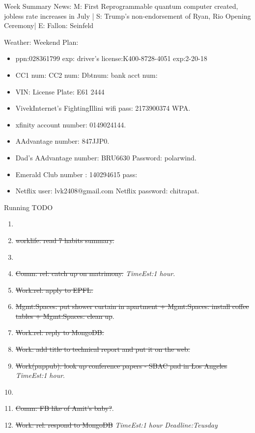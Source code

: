 \documentclass[serif, mathserif, final]{beamer}
\newcommand{\doneTask}[1]{\tiny \item \tiny \sout{#1}}
\newcommand{\te}[1]{\textit{TimeEst:}\textit{#1}}
\newcommand{\dl}[1]{\textit{Deadline:}\textit{#1}}
\begin{document}
\begin{frame}
\begin{columns}
\begin{column}{0.5\linewidth}
\begin{block}{Week Summary}
        { News: M: First Reprogrammable quantum computer created,
          jobless rate increases in July | S: Trump's non-endorsement
          of Ryan,  Rio Opening Ceremony|  E: Fallon:  Seinfeld} 

        {Weather:  }
        Weekend Plan: 
        \begin{itemize}
        \item \tiny ppn:028361799  exp: driver's
          license:K400-8728-4051  exp:2-20-18
        \item \tiny CC1 num: CC2 num: Dbtnum:  bank acct num: 
        \item \tiny VIN:  License Plate:  E61 2444
        \item \tiny VivekInternet’s FightingIllini  wifi pass:
          2173900374 WPA. 
        \item \tiny xfinity account number: 0149024144. 
        \item \tiny AAdvantage number: 847JJP0. 
        \item \tiny Dad's AAdvantage number: BRU6630 Password:
          polarwind. 
        \item \tiny Emerald Club number :  140294615   pass:   
        \item \tiny Netflix user:  lvk2408@gmail.com  Netflix 
          password: chitrapat. 
        \end{itemize} 
      \end{block}


      \begin{block}{Running TODO} %
        \begin{enumerate} 
        \item \tiny \doneTask{worklife: read 7 habits summary. }
        \item \tiny \doneTask{Comm: rel: catch up on matrimony.} \te{1
          hour}.           
          \doneTask{Work:rel: apply to EPFL.}  
          \doneTask{Mgmt:Spaces: put shower curtain in apartment +
            Mgmt:Spaces: install coffee tables + Mgmt:Spaces: clean up}.
          \doneTask{Work:rel: reply to MongoDB.} 
          \doneTask{ Work: add title to technical report and put it on
            the web.} 
          \doneTask{Work(pappub): look up conference papers - SBAC pad
            in Los Angeles} \te{1 hour}.

        \item \tiny \doneTask{Comm: FB like of Amit's baby?}. 
          \doneTask{Work: rel: respond to MongoDB} \te{1 hour}
          \dl{Teusday} 


\end{enumerate}
\end{block}
\end{column}
\end{columns}
\end{frame}
\end{document}
